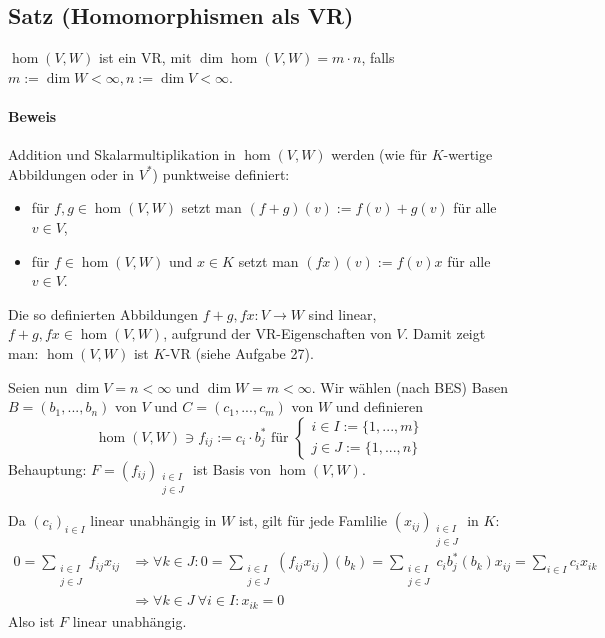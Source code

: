 \subsection{Satz (Homomorphismen als VR)}
	\begin{Satz}
		$ \hom (V,W) $ ist ein VR, mit $\dim\hom (V,W) = m\cdot n$, falls $m:=\dim W<\infty, n:=\dim V< \infty$.
	\end{Satz}
\paragraph{Beweis}
	Addition und Skalarmultiplikation in $\hom (V,W)$ werden (wie für $K$-wertige Abbildungen oder in $V^*$) punktweise definiert:
	\begin{itemize}
		\item für $f,g \in \hom (V,W)$ setzt man $(f+g)(v) := f(v) + g(v)$ für alle $v\in V$,
		\item für $f\in \hom (V,W)$ und $x\in K$ setzt man $(fx)(v) := f(v)x$ für alle $v\in V$.
	\end{itemize}
	Die so definierten Abbildungen $f+g,fx: V\to W$ sind linear, $f+g, fx\in \hom (V,W)$, aufgrund der VR-Eigenschaften von $V$. Damit zeigt man: $\hom (V,W)$ ist $K$-VR (siehe Aufgabe 27).

	Seien nun $\dim V = n < \infty$ und $\dim W = m < \infty$.
	Wir wählen (nach BES) Basen $B = (b_1,...,b_n)$ von $V$ und $C=(c_1,...,c_m)$ von $W$ und definieren
		\begin{equation*}
			\hom (V,W) \ni f_{ij}:= c_i\cdot b_j^* \text{ für } 
				\begin{cases}
					i\in I := \{1,...,m\}\\
					j\in J := \{1,...,n\}
				\end{cases}
		\end{equation*}
	Behauptung: $F=(f_{ij})_{\substack{i\in I\\j \in J}}$ ist Basis von $\hom (V,W)$.
	
	Da $(c_i)_{i\in I}$ linear unabhängig in $W$ ist, gilt für jede Famlilie $(x_{ij})_{\substack{i\in I\\j \in J}}$ in $K$:
		\begin{align*}
			0 = \sum_{\substack{i\in I\\j \in J}} f_{ij}x_{ij} &\Rightarrow \forall k \in J: 0 = \sum_{\substack{i\in I\\j \in J}} (f_{ij}x_{ij})(b_k) = \sum_{\substack{i\in I\\j \in J}} c_i b_j^* (b_k) x_{ij} = \sum_{i\in I} c_ix_{ik} \\
			&\Rightarrow \forall k\in J\ \forall i\in I:x_{ik} = 0
		\end{align*}
	Also ist $F$ linear unabhängig.
	
